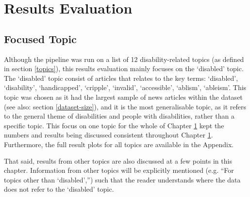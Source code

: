 \documentclass{report}
\begin{document}



\chapter{Results Evaluation} \label{Results Evaluation}  %

\section{Focused Topic} \label{Focused topic}
Although the pipeline was run on a list of 12 disability-related topics (as defined in section \ref{topics}), this results evaluation mainly focuses on the `disabled' topic.
The `disabled' topic consist of articles that relates to the key terms: `disabled', `disability', `handicapped', `cripple', `invalid', `accessible', `ablism', `ableism'.
This topic was chosen as it had the largest sample of news articles within the dataset (see also: section \ref{dataset-size}), and it is the most generalisable topic, as it refers to the general theme of disabilities and people with disabilities, rather than a specific topic.
This focus on one topic for the whole of Chapter \ref{Results Evaluation} kept the numbers and results being discussed consistent throughout Chapter \ref{Results Evaluation}.
Furthermore, the full result plots for all topics are available in the Appendix.

That said, results from other topics are also discussed at a few points in this chapter.
Information from other topics will be explicitly mentioned (e.g. ``For topics other than `disabled','') such that the reader understands where the data does not refer to the `disabled' topic.
\end{document}
